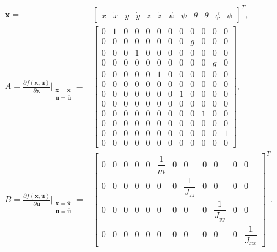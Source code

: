 \begin{align}
\begin{split}
\mathbf{x} = & \begin{bmatrix}
x & \dot{x} & y & \dot{y} & z & \dot{z} & \psi & \dot{\psi} & \theta & \dot{\theta} & \phi & \dot{\phi}
\end{bmatrix}^{T},\\
A  = \frac{\partial f(\mathbf{x},\mathbf{u})}{\partial \mathbf{x}}\Bigr|_{\substack{\mathbf{x}=\overline{\mathbf{x}}\\\mathbf{u}=\overline{\mathbf{u}}}} = & 
\begin{bmatrix}
0 & 1 & 0 & 0 & 0 & 0 & 0 & 0 & 0 & 0 & 0 & 0\\[2px]
0 & 0 & 0 & 0 & 0 & 0 & 0 & 0 & g & 0 & 0 & 0\\[2px]
0 & 0 & 0 & 1 & 0 & 0 & 0 & 0 & 0 & 0 & 0 & 0\\[2px]
0 & 0 & 0 & 0 & 0 & 0 & 0 & 0 & 0 & 0 & g & 0\\[2px]
0 & 0 & 0 & 0 & 0 & 1 & 0 & 0 & 0 & 0 & 0 & 0\\[2px]
0 & 0 & 0 & 0 & 0 & 0 & 0 & 0 & 0 & 0 & 0 & 0\\[2px]
0 & 0 & 0 & 0 & 0 & 0 & 0 & 1 & 0 & 0 & 0 & 0\\[2px]
0 & 0 & 0 & 0 & 0 & 0 & 0 & 0 & 0 & 0 & 0 & 0\\[2px]
0 & 0 & 0 & 0 & 0 & 0 & 0 & 0 & 0 & 1 & 0 & 0\\[2px]
0 & 0 & 0 & 0 & 0 & 0 & 0 & 0 & 0 & 0 & 0 & 0\\[2px]
0 & 0 & 0 & 0 & 0 & 0 & 0 & 0 & 0 & 0 & 0 & 1\\[2px]
0 & 0 & 0 & 0 & 0 & 0 & 0 & 0 & 0 & 0 & 0 & 0
\end{bmatrix}, \\[15px]
B = \frac{\partial f(\mathbf{x},\mathbf{u})}{\partial \mathbf{u}}\Bigr|_{\substack{\mathbf{x}=\overline{\mathbf{x}}\\\mathbf{u}=\overline{\mathbf{u}}}} = & 
\begin{bmatrix}
0 & 0 & 0 & 0 & 0 & \dfrac{1}{m} & 0 & 0 & 0 & 0 & 0 & 0\\[5px]
0 & 0 & 0 & 0 & 0 & 0 & 0 & \dfrac{1}{J_{zz}} & 0 & 0 & 0 & 0\\[5px]
0 & 0 & 0 & 0 & 0 & 0 & 0 & 0 & 0 & \dfrac{1}{J_{yy}} & 0 & 0\\[5px]
0 & 0 & 0 & 0 & 0 & 0 & 0 & 0 & 0 & 0 & 0 & \dfrac{1}{J_{xx}}
\end{bmatrix}^{T}.
\end{split}
\end{align}

